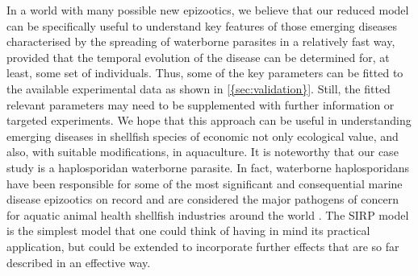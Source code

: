 In a world with many possible new epizootics, we believe that our reduced model
can be specifically useful to understand key features of those emerging
diseases characterised by the spreading of waterborne parasites in a relatively
fast way, provided that the temporal evolution of the disease can be determined
for, at least, some set of individuals. Thus, some of the key parameters can be
fitted to the available experimental data as shown in \cref{{sec:validation}}.
Still, the fitted relevant parameters may need to be supplemented with further
information or targeted experiments. We hope that this approach can be useful
in understanding emerging diseases in shellfish species of economic not only
ecological value, and also, with suitable modifications, in aquaculture. It is
noteworthy that our case study is a haplosporidan waterborne parasite.	In
fact, waterborne haplosporidans have been responsible for some of the most
significant and consequential marine disease epizootics on record and are
considered the major pathogens of concern for aquatic animal health shellfish
industries around the world \cite{Arzul2015}. The SIRP model is the simplest
model that one could think of having in mind its practical application, but
could be extended to incorporate further effects that are so far described in
an effective way.